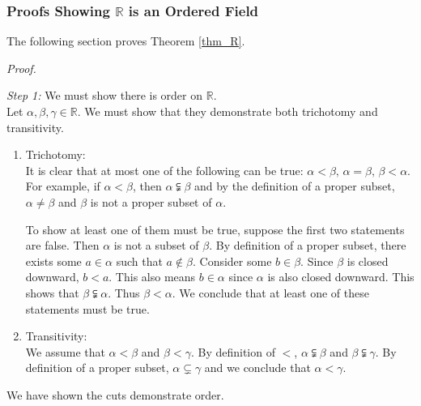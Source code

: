 \documentclass[../main.tex]{subfiles}
\begin{document}

\subsubsection{Proofs Showing \( \mathbb{R} \) is an Ordered Field}

The following section proves Theorem \ref{thm_R}.

\textit{Proof.}

\emph{Step 1:} We must show there is order on \( \mathbb{R} \). \\
Let \( \alpha,\beta,\gamma \in \mathbb{R} \).
We must show that they demonstrate both trichotomy and transitivity.
\begin{enumerate}
    \item Trichotomy: \\
    It is clear that at most one of the following can be true: \( \alpha < \beta, \, \alpha = \beta , \, \beta < \alpha \).
    For example, if \( \alpha < \beta \), then \( \alpha \subsetneqq \beta \)
    and by the definition of a proper subset, \( \alpha \neq \beta \) and \( \beta \) is not a proper subset of \( \alpha \).
    
    To show at least one of them must be true, suppose the first two statements are false.
    Then \( \alpha \) is not a subset of \( \beta \).
    By definition of a proper subset, there exists some \( a \in \alpha \) such that \( a \notin \beta \).
    Consider some \( b \in \beta \). Since \( \beta \) is closed downward, \( b < a \).
    This also means \( b \in \alpha \) since \( \alpha \) is also closed downward.
    This shows that \( \beta \subsetneqq \alpha \). Thus \( \beta < \alpha \).
    We conclude that at least one of these statements must be true.

    \item Transitivity: \\
    We assume that \( \alpha < \beta \) and \( \beta < \gamma \).
    By definition of \( < \), \( \alpha \subsetneqq \beta \) and \( \beta \subsetneqq \gamma \).
    By definition of a proper subset, \( \alpha \subsetneq \gamma \) and we conclude that \( \alpha < \gamma \).
\end{enumerate}
We have shown the cuts demonstrate order.
\end{document}
